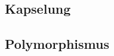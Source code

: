 \subsection{Kapselung} \label{subsec:Kapselung}

\subsection{Polymorphismus} \label{subsec:Polymorphismus}



